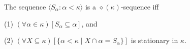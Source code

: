 The sequence $\langle S_{\alpha}: \alpha < \kappa \rangle$ is a $\diamond(\kappa)$-sequence iff

(1) $(\forall \alpha \in \kappa)[S_{\alpha} \subseteq \alpha]$, and

(2) $(\forall X \subseteq \kappa)[\{\alpha < \kappa \mid X \cap \alpha = S_{\alpha}\}]$ is stationary in $\kappa$.
